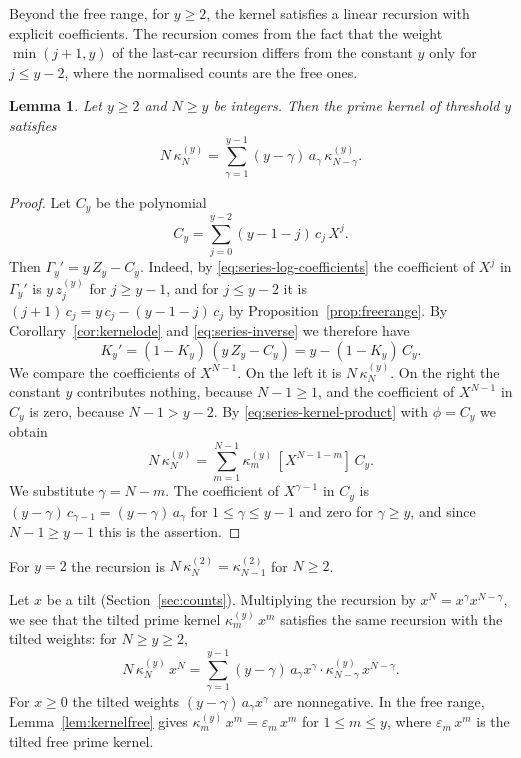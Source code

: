 \documentclass{amsart}
\newtheorem{lemma}[theorem]{Lemma}
\theoremstyle{definition}
\theoremstyle{remark}
\numberwithin{equation}{section}
\begin{document}
Beyond the free range, for $y\ge2$, the kernel satisfies a linear recursion
with explicit coefficients. The
recursion comes from the fact that the weight $\min(j+1,y)$ of the last-car
recursion differs from the constant $y$ only for $j\le y-2$, where the
normalised counts are the free ones.

\begin{lemma}\label{lem:kernelrecursion}
Let $y\ge2$ and $N\ge y$ be integers. Then the prime kernel of threshold $y$
satisfies
\[
N\,\kappa^{(y)}_N=\sum_{\gamma=1}^{y-1}(y-\gamma)\,a_\gamma\,
\kappa^{(y)}_{N-\gamma} .
\]
\end{lemma}

\begin{proof}
Let $C_y$ be the polynomial
\[
C_y=\sum_{j=0}^{y-2}(y-1-j)\,c_j\,X^j .
\]
Then $\Gamma_y'=y\,Z_y-C_y$. Indeed, by \eqref{eq:series-log-coefficients}
the coefficient of $X^j$ in $\Gamma_y'$ is $y\,z^{(y)}_j$ for $j\ge y-1$,
and for $j\le y-2$ it is $(j+1)\,c_j=y\,c_j-(y-1-j)\,c_j$ by
Proposition~\ref{prop:freerange}. By Corollary~\ref{cor:kernelode} and
\eqref{eq:series-inverse} we therefore have
\[
K_y'=(1-K_y)\,(y\,Z_y-C_y)=y-(1-K_y)\,C_y .
\]
We compare the coefficients of $X^{N-1}$. On the left it is
$N\,\kappa^{(y)}_N$. On the right the constant $y$ contributes nothing,
because $N-1\ge1$, and the coefficient of $X^{N-1}$ in $C_y$ is zero,
because $N-1>y-2$. By
\eqref{eq:series-kernel-product} with $\phi=C_y$ we obtain
\[
N\,\kappa^{(y)}_N=\sum_{m=1}^{N-1}\kappa^{(y)}_m\,[X^{N-1-m}]\,C_y .
\]
We substitute $\gamma=N-m$. The coefficient of $X^{\gamma-1}$ in $C_y$ is
$(y-\gamma)\,c_{\gamma-1}=(y-\gamma)\,a_\gamma$ for $1\le\gamma\le y-1$ and
zero for $\gamma\ge y$, and since $N-1\ge y-1$ this is the assertion.
\end{proof}

For $y=2$ the recursion is $N\,\kappa^{(2)}_N=\kappa^{(2)}_{N-1}$ for
$N\ge2$.

Let $x$ be a tilt (Section~\ref{sec:counts}).
Multiplying the recursion by $x^N=x^\gamma x^{N-\gamma}$, we see that the
tilted prime kernel $\kappa^{(y)}_m\,x^m$ satisfies the same recursion with
the tilted weights: for $N\ge y\ge2$,
\begin{equation}\label{eq:series-tilted-recursion}
N\,\kappa^{(y)}_N\,x^N=\sum_{\gamma=1}^{y-1}(y-\gamma)\,a_\gamma x^\gamma
\cdot\kappa^{(y)}_{N-\gamma}\,x^{N-\gamma} .
\end{equation}
For $x\ge0$ the tilted weights $(y-\gamma)\,a_\gamma x^\gamma$ are
nonnegative. In the free range,
Lemma~\ref{lem:kernelfree} gives $\kappa^{(y)}_m\,x^m=\varepsilon_m\,x^m$ for
$1\le m\le y$, where $\varepsilon_m\,x^m$ is the tilted free prime kernel.
\end{document}
